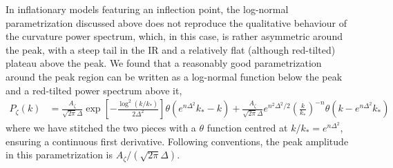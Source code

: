 \documentclass{article}
\begin{document}
In inflationary models featuring an inflection point, the log-normal parametrization discussed above does not reproduce the qualitative behaviour of the curvature power spectrum, which, in this case, is rather asymmetric around the peak, with a steep tail in the IR and a relatively flat (although red-tilted) plateau above the peak. We found that a reasonably good parametrization around the peak region can be written as a log-normal function below the peak and a red-tilted power spectrum above it,
\begin{align}\label{eq:broken ps scalar}
    P_\zeta (k) & = \frac{A_\zeta}{\sqrt{2\pi} \Delta} \exp \left[ - \frac{\log^2(k/k_*)}{2\Delta^2}\right] \theta(e^{n\Delta^2} k_*-k) + \frac{A_\zeta}{\sqrt{2\pi} \Delta} e^{n^2\Delta^2/2} \left( \frac{k}{k_*}\right)^{-n} \theta(k- e^{n\Delta^2} k_*)
\end{align}
%
where we have stitched the two pieces with a $\theta$ function centred at $k/k_* = e^{n\Delta^2}$, ensuring a continuous first derivative. Following conventions, the peak amplitude in this parametrization is $A_\zeta/(\sqrt{2\pi}\Delta)$.
\end{document}
